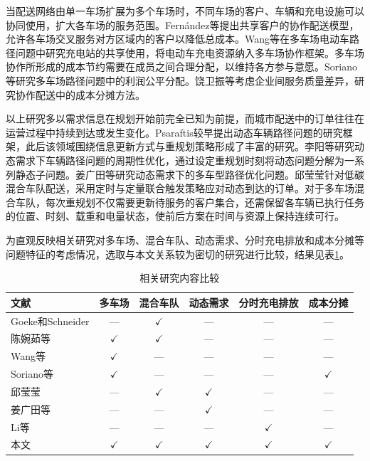 \documentclass{setp-new}
\newcommand{\setptabsetup}{\small\renewcommand{\arraystretch}{0.95}\setlength{\tabcolsep}{2.2pt}\hbadness=10000}
\begin{document}
当配送网络由单一车场扩展为多个车场时，不同车场的客户、车辆和充电设施可以协同使用，扩大各车场的服务范围。Fernández等\cite{ref:49}提出共享客户的协作配送模型，允许各车场交叉服务对方区域内的客户以降低总成本。Wang等\cite{ref:7}在多车场电动车路径问题中研究充电站的共享使用，将电动车充电资源纳入多车场协作框架。多车场协作所形成的成本节约需要在成员之间合理分配，以维持各方参与意愿。Soriano等\cite{ref:8}研究多车场路径问题中的利润公平分配。饶卫振等\cite{ref:91}考虑企业间服务质量差异，研究协作配送中的成本分摊方法。

以上研究多以需求信息在规划开始前完全已知为前提，而城市配送中的订单往往在运营过程中持续到达或发生变化。Psaraftis\cite{ref:14}较早提出动态车辆路径问题的研究框架，此后该领域围绕信息更新方式与重规划策略形成了丰富的研究。李阳等\cite{ref:18}研究动态需求下车辆路径问题的周期性优化，通过设定重规划时刻将动态问题分解为一系列静态子问题。姜广田等\cite{ref:51}研究动态需求下的多车型路径优化问题。邱莹莹\cite{ref:71}针对低碳混合车队配送，采用定时与定量联合触发策略应对动态到达的订单。对于多车场混合车队，每次重规划不仅需要更新待服务的客户集合，还需保留各车辆已执行任务的位置、时刻、载重和电量状态，使前后方案在时间与资源上保持连续可行。

为直观反映相关研究对多车场、混合车队、动态需求、分时充电排放和成本分摊等问题特征的考虑情况，选取与本文关系较为密切的研究进行比较，结果见表\ref{tab:literature-comparison}。

\begin{table}[H]
\centering
\caption{相关研究内容比较}
\label{tab:literature-comparison}
\setptabsetup
\begin{tabular*}{\linewidth}{@{\extracolsep{\fill}}lccccc@{}}
\toprule
文献 & 多车场 & 混合车队 & 动态需求 & 分时充电排放 & 成本分摊\\
\midrule
Goeke和Schneider\cite{ref:27} & --- & $\checkmark$ & --- & --- & ---\\
陈婉茹等\cite{ref:23} & $\checkmark$ & $\checkmark$ & --- & --- & ---\\
Wang等\cite{ref:7} & $\checkmark$ & --- & --- & --- & ---\\
Soriano等\cite{ref:8} & $\checkmark$ & --- & --- & --- & $\checkmark$\\
邱莹莹\cite{ref:71} & --- & $\checkmark$ & $\checkmark$ & --- & ---\\
姜广田等\cite{ref:51} & --- & --- & $\checkmark$ & --- & ---\\
Li等\cite{ref:52} & --- & --- & --- & $\checkmark$ & ---\\
本文 & $\checkmark$ & $\checkmark$ & $\checkmark$ & $\checkmark$ & $\checkmark$\\
\bottomrule
\end{tabular*}
\end{table}
\end{document}
